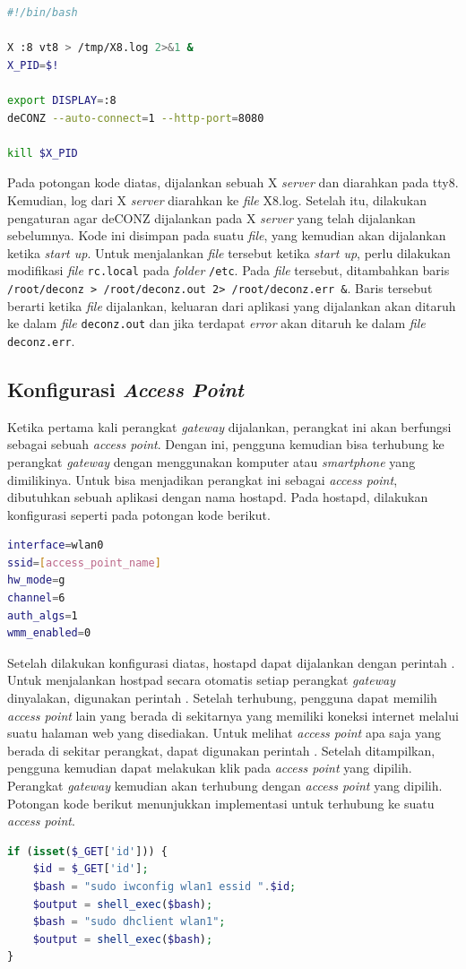 \begin{lstlisting}[language=bash,caption=kode untuk menjalankan X \textit{server} dan memulai deCONZ]
#!/bin/bash

X :8 vt8 > /tmp/X8.log 2>&1 &
X_PID=$!

export DISPLAY=:8
deCONZ --auto-connect=1 --http-port=8080

kill $X_PID
\end{lstlisting}

Pada potongan kode diatas, dijalankan sebuah X \textit{server} dan diarahkan pada tty8. Kemudian, log dari X \textit{server} diarahkan ke \textit{file} X8.log. Setelah itu, dilakukan pengaturan agar deCONZ dijalankan pada X \textit{server} yang telah dijalankan sebelumnya. Kode ini disimpan pada suatu \textit{file}, yang kemudian akan dijalankan ketika \textit{start up}. Untuk menjalankan \textit{file} tersebut ketika \textit{start up}, perlu dilakukan modifikasi \textit{file} \texttt{rc.local} pada \textit{folder} \texttt{/etc}. Pada \textit{file} tersebut, ditambahkan baris \texttt{/root/deconz > /root/deconz.out 2> /root/deconz.err \&}. Baris tersebut berarti ketika \textit{file} dijalankan, keluaran dari aplikasi yang dijalankan akan ditaruh ke dalam \textit{file} \texttt{deconz.out} dan jika terdapat \textit{error} akan ditaruh ke dalam \textit{file} \texttt{deconz.err}.

\subsection{Konfigurasi \textit{Access Point}}
Ketika pertama kali perangkat \textit{gateway} dijalankan, perangkat ini akan berfungsi sebagai sebuah \textit{access point}. Dengan ini, pengguna kemudian bisa terhubung ke perangkat \textit{gateway} dengan menggunakan komputer atau \textit{smartphone} yang dimilikinya. Untuk bisa menjadikan perangkat ini sebagai \textit{access point}, dibutuhkan sebuah aplikasi dengan nama hostapd. Pada hostapd, dilakukan konfigurasi seperti pada potongan kode berikut.

\begin{lstlisting}[language=bash,caption=Konfigurasi hostapd]
interface=wlan0
ssid=[access_point_name]
hw_mode=g
channel=6
auth_algs=1
wmm_enabled=0
\end{lstlisting}

Setelah dilakukan konfigurasi diatas, hostapd dapat dijalankan dengan perintah . Untuk menjalankan hostpad secara otomatis setiap perangkat \textit{gateway} dinyalakan, digunakan perintah . Setelah terhubung, pengguna dapat memilih \textit{access point} lain yang berada di sekitarnya yang memiliki koneksi internet melalui suatu halaman web yang disediakan. Untuk melihat \textit{access point} apa saja yang berada di sekitar perangkat, dapat digunakan perintah . Setelah ditampilkan, pengguna kemudian dapat melakukan klik pada \textit{access point} yang dipilih. Perangkat \textit{gateway} kemudian akan terhubung dengan \textit{access point} yang dipilih. Potongan kode berikut menunjukkan implementasi untuk terhubung ke suatu \textit{access point}.

\begin{lstlisting}[language=php,caption=Kode untuk terhubung ke suatu \textit{access point}]
if (isset($_GET['id'])) {
	$id = $_GET['id'];
	$bash = "sudo iwconfig wlan1 essid ".$id;
	$output = shell_exec($bash);
	$bash = "sudo dhclient wlan1";
	$output = shell_exec($bash);
}
\end{lstlisting}
